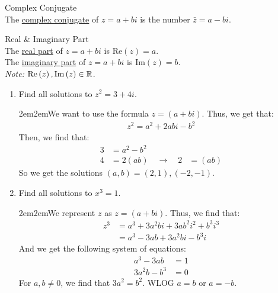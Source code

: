 \documentclass[10pt]{paper}
\newcommand{\real}[1]{\text{Re}\left(#1\right)}
\newcommand{\im}[1]{\text{Im}\left(#1\right)}
\newcommand{\gspc}{\vspace{0.13cm}} %
\newcommand{\gline}[0]{\gspc\\} %
\newcommand{\ul}[1]{\underline{#1}}
\newenvironment{problem}[1]
  {\vspace{-0.1cm}\begin{coloredadjust}\begin{adjustwidth}{2em}{2em}#1}
  {
\end{adjustwidth}\end{coloredadjust}\gspc}
\begin{document}
\begin{definition}{Complex Conjugate}{}\gline{}
  The \ul{complex conjugate} of $z = a+bi$ is the number $\bar z = a - bi$. 
\end{definition}

\begin{definition}{Real \& Imaginary Part}{}\gline{}
  The \ul{real part} of $z = a+bi$ is $\real{z} = a$. \\
  The \ul{imaginary part} of $z = a+bi$ is $\im{z} = b$. \gline{}
  \textit{Note: }$\real{z},\im{z}\in \R$. 
\end{definition}

\begin{enumerate}
  \item [2.] Find all solutions to $z^2 = 3+ 4i$.
  \begin{problem}
    We want to use the formula $z = (a+bi)$. Thus, we get that:
    \begin{align*}
      z^2 = a^2 + 2abi - b^2
    \end{align*}
    Then, we find that:
    \begin{align*}
      3&= a^2 - b^2\\
      4 &= 2(ab) \quad\rightarrow \quad 2 &= (ab)
    \end{align*}
    So we get the solutions $(a,b) = (2, 1), (-2, -1)$.
  \end{problem}
  \item [3.] Find all solutions to $x^3 = 1$. 
  \begin{problem}
    We represent $z$ as $z = (a+bi)$. Thus, we find that:
    \begin{align*}
      z^3 &= a^3 + 3 a^2 b i + 3 a b^2 i^2 + b^3 i^3\\
      &= a^3 - 3ab + 3a^2bi - b^3 i
    \end{align*}
    And we get the following system of equations:
    \begin{align*}
      a^3 - 3ab &= 1\\
      3a^2b - b^3 &= 0
    \end{align*}
    For $a, b\ne 0$, we find that $3a^2 = b^2$. WLOG $a = b$ or $a = -b$. 
  \end{problem}
\end{enumerate}
\end{document}
